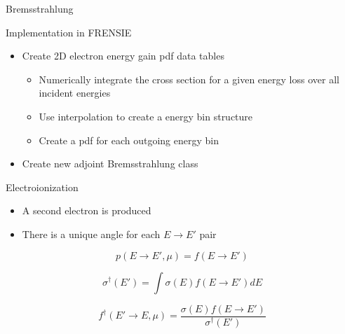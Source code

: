 \documentclass{beamer}
\begin{document}
\begin{frame}{Bremsstrahlung}

\begin{block}{Implementation in FRENSIE}
	\begin{itemize}
	\item Create 2D electron energy gain pdf data tables
		\begin{itemize}
		\item Numerically integrate the cross section for a given energy loss over all incident energies
		\item Use interpolation to create a energy bin structure
		\item Create a pdf for each outgoing energy bin
		\end{itemize}
	
	\item Create new adjoint Bremsstrahlung class
	\end{itemize}
\end{block}

\end{frame}

\begin{frame}{Electroionization}
	\begin{itemize}
	\item A second electron is produced
	\item There is a unique angle for each $E \rightarrow E'$ pair
	\end{itemize}

\begin{equation}
p(E \rightarrow E', \mu) = f(E \rightarrow E')
\end{equation}

\begin{equation}
\sigma^{\dagger}(E') = \int\sigma(E)f(E \rightarrow E')dE
\end{equation}

\begin{equation}
f^{\dagger}(E'\rightarrow E, \mu) = \frac{\sigma(E)f(E \rightarrow E')}{\sigma^{\dagger}(E')} 
\end{equation}

\end{frame}
\end{document}
